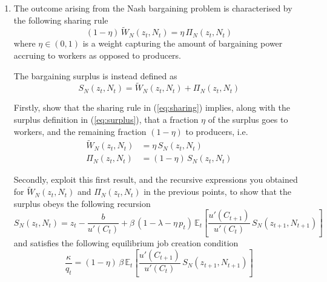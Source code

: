 \documentclass[dvipsnames,11pt]{article}
\begin{document}
\begin{enumerate}
                \begin{solution}
                  Combining the first order conditions, we have:
\begin{align*}
    & \mu_t = \frac{\kappa}{q_t} \\
    & \frac{\kappa}{q_t}=\beta \mathbb{E}_t \left [\frac{u'(C_{t+1})}{u'(C_t)} \frac{\partial \Pi(z_{t+1},N_{t+1})}{\partial N_{t+1}} \right]= \beta \mathbb{E}_t\left[\frac{u'(C_{t+1})}{u'(C_t}\Pi_N(z_{t+1},N_{t+1})\right]
\end{align*}
  
                \end{solution}

\item The outcome  arising from the Nash bargaining problem is characterised by the following sharing rule
\begin{equation}\label{eq:sharing}
    (1-\eta)\,\widetilde{W}_N(z_t,N_t) = \eta\,\Pi_N(z_t,N_t)
\end{equation}
where $\eta\in(0,1)$ is a weight capturing the amount of bargaining power accruing to workers as opposed to producers.

The bargaining surplus is instead defined as
\begin{equation}\label{eq:surplus}
    S_N(z_t,N_t) = \widetilde{W}_N(z_t,N_t) + \Pi_N(z_t,N_t)
\end{equation}

Firstly, show that the sharing rule in (\ref{eq:sharing}) implies, along with the surplus definition in (\ref{eq:surplus}), that a fraction $\eta$ of the surplus goes to workers, and the remaining fraction $(1-\eta)$ to producers, i.e.
\begin{align*}
    \widetilde{W}_N(z_t,N_t)    &=  \eta\,S_N(z_t,N_t)
    \\
    \Pi_N(z_t,N_t)              &=  (1-\eta)\,S_N(z_t,N_t)
\end{align*}

Secondly, exploit this first result, and the recursive expressions you obtained for $\widetilde{W}_N(z_t,N_t)$ and $\Pi_N(z_t,N_t)$ in the previous points, to show that the surplus obeys the following recursion
$$ S_N(z_t,N_t) = z_t - \frac{b}{u'(C_t)} + \beta\,\left(1-\lambda - \eta\,p_t\right)\,\mathbb{E}_t\left[\frac{u'(C_{t+1})}{u'(C_t)}\, S_N(z_{t+1},N_{t+1})\right] $$
and satisfies the following equilibrium job creation condition
$$ \frac{\kappa}{q_t} = (1-\eta)\, \beta\,\mathbb{E}_t\left[\frac{u'(C_{t+1})}{u'(C_t)}\, S_N(z_{t+1},N_{t+1})\right] $$


\end{enumerate}
\end{document}
